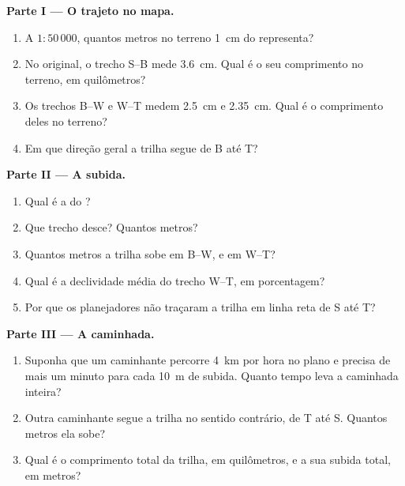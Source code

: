\begin{problem}
\noindent\textbf{Parte I --- O trajeto no mapa.}\par\nopagebreak
\begin{enumerate}[beginpenalty=10000]
  \item A $1 : 50\,000$, quantos metros no terreno \qty{1}{cm} do 
        representa?
  \item No  original, o trecho S--B mede \qty{3.6}{cm}. Qual é o seu
        comprimento no terreno, em quilômetros?
  \item Os trechos B--W e W--T medem \qty{2.5}{cm} e \qty{2.35}{cm}. Qual
        é o comprimento deles no terreno?
  \item Em que direção geral a trilha segue de B até T?
\end{enumerate}

\noindent\textbf{Parte II --- A subida.}\par\nopagebreak
\begin{enumerate}[resume, beginpenalty=10000]
  \item Qual é a  do ?
  \item Que trecho desce? Quantos metros?
  \item Quantos metros a trilha sobe em B--W, e em W--T?
  \item Qual é a declividade média do trecho W--T, em porcentagem?
  \item Por que os planejadores não traçaram a trilha em linha reta de S
        até T?
\end{enumerate}

\noindent\textbf{Parte III --- A caminhada.}\par\nopagebreak
\begin{enumerate}[resume, beginpenalty=10000]
  \item Suponha que um caminhante percorre \qty{4}{km} por hora no plano e
        precisa de mais um minuto para cada \qty{10}{m} de subida. Quanto
        tempo leva a caminhada inteira?
  \item Outra caminhante segue a trilha no sentido contrário, de T até S.
        Quantos metros ela sobe?
  \item Qual é o comprimento total da trilha, em quilômetros, e a sua
        subida total, em metros?
\end{enumerate}
\end{problem}
